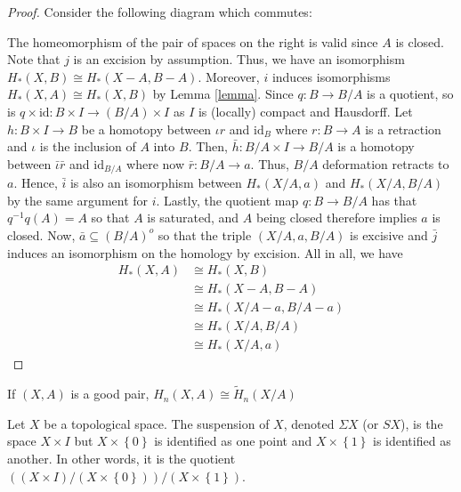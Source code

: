\documentclass[12pt,reqno]{amsart}
\numberwithin{theorem}{section}
\theoremstyle{definition}
\theoremstyle{remark}
\numberwithin{equation}{section}
\newcommand{\set}[1]{\left \{ #1 \right \}}
\theoremstyle{definition}
\newcommand{\id}{\mathrm{id}}
\begin{document}
\begin{proof}
    Consider the following diagram which commutes:
    \begin{center}
    \end{center}
    The homeomorphism of the pair of spaces on the right is valid since $A$ is closed. Note that $j$ is an excision by assumption. Thus, we have an isomorphism $H_*(X,B) \cong H_*(X-A,B-A)$. Moreover, $i$ induces isomorphisms $H_*(X,A)\cong H_*(X,B)$ by Lemma \ref{lemma}. Since $q:B \rightarrow B/A$ is a quotient, so is $q\times \id:B\times I \rightarrow (B/A) \times I$ as $I$ is (locally) compact and Hausdorff. Let $h:B\times I\rightarrow B$ be a homotopy between $\iota r$ and $\id_B$ where $r:B \rightarrow A$ is a retraction and $\iota$ is the inclusion of $A$ into $B$. Then, $\bar h: B/A\times I\rightarrow B/A$ is a homotopy between $\bar \iota \bar r$ and $\id_{B/A}$ where now $\bar r:B/A\rightarrow a$. Thus, $B/A$ deformation retracts to $a$. Hence, $\bar i$ is also an isomorphism between $H_*(X/A,a)$ and $H_*(X/A,B/A)$ by the same argument for $i$. Lastly, the quotient map $q:B\rightarrow B/A$ has that $q^{-1}q(A) = A$ so that $A$ is saturated, and $A$ being closed therefore implies $a$ is closed. Now, $\bar a  \subseteq (B/A)^o$ so that the triple $(X/A,a,B/A)$ is excisive and $\bar j$ induces an isomorphism on the homology by excision. All in all, we have
    \begin{align*}
        H_*(X,A) &\cong H_*(X,B) \\
        &\cong H_*(X-A,B-A)\\ &\cong H_*(X/A-a,B/A-a) \\&\cong H_*(X/A,B/A)\\&\cong H_*(X/A,a)
    \end{align*}
\end{proof}
\begin{corollary}
    If $(X,A)$ is a good pair, $H_n(X,A) \cong \tilde H_n(X/A)$
\end{corollary}
\begin{definition}
    Let $X$ be a topological space. The suspension of $X$, denoted $\Sigma X$ (or $SX$), is the space $X\times I$ but $X\times \set{0}$ is identified as one point and $X\times \set{1}$ is identified as another. In other words, it is the quotient $((X\times I)/(X\times \set 0))/(X\times \set 1)$.
\end{definition}
\end{document}
